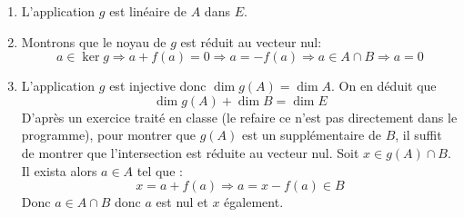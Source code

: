 \begin{enumerate}
 \item L'application $g$ est linéaire de $A$ dans $E$.
\item Montrons que le noyau de $g$ est réduit au vecteur nul:
\begin{displaymath}
 a\in \ker g \Rightarrow a+f(a)=0 \Rightarrow a=-f(a)\Rightarrow a\in A \cap B \Rightarrow a=0
\end{displaymath}
\item  L'application $g$ est injective donc $\dim g(A)= \dim A$. On en déduit que
\begin{displaymath}
 \dim g(A) + \dim B = \dim E
\end{displaymath}
D'après un exercice traité en classe (le refaire ce n'est pas directement dans le programme), pour montrer que $g(A)$ est un supplémentaire de $B$, il suffit de montrer que l'intersection est réduite au vecteur nul. Soit $x\in g(A)\cap B$. Il exista alors $a\in A$ tel que :
\begin{displaymath}
 x=a+f(a) \Rightarrow a = x -f(a) \in B
\end{displaymath}
Donc $a\in A\cap B$ donc $a$ est nul et $x$ également.
\end{enumerate}
